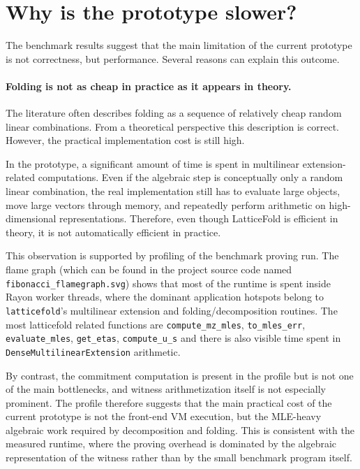 \section{Why is the prototype slower?}

The benchmark results suggest that the main limitation of the current prototype
is not correctness, but performance. Several reasons can explain this outcome.

\paragraph{Folding is not as cheap in practice as it appears in theory.}

The literature often describes folding as a sequence of relatively cheap random
linear combinations. From a theoretical perspective this description is correct.
However, the practical implementation cost is still high.

In the prototype, a significant amount of time is spent in multilinear
extension-related computations. Even if the algebraic step is conceptually only
a random linear combination, the real implementation still has to evaluate large
objects, move large vectors through memory, and repeatedly perform arithmetic on
high-dimensional representations. Therefore, even though LatticeFold is
efficient in theory, it is not automatically efficient in practice.

This observation is supported by profiling of the benchmark proving run. The
flame graph (which can be found in the project source code named\\\texttt{fibonacci\_flamegraph.svg}) shows that most of the
runtime is spent inside Rayon worker threads, where the dominant application
hotspots belong to \texttt{latticefold}'s multilinear extension and
folding/decomposition routines. The most latticefold related functions are
\texttt{compute\_mz\_mles}, \texttt{to\_mles\_err},
\texttt{evaluate\_mles}, \texttt{get\_etas},
\texttt{compute\_u\_s} and there is also visible time spent in
\texttt{DenseMultilinearExtension} arithmetic.

By contrast, the commitment computation is present in the profile but is not one
of the main bottlenecks, and witness arithmetization itself is not especially
prominent. The profile therefore suggests that the main practical cost of the
current prototype is not the front-end VM execution, but the MLE-heavy algebraic
work required by decomposition and folding. This is consistent with the measured
runtime, where the proving overhead is dominated by the algebraic representation
of the witness rather than by the small benchmark program itself.

